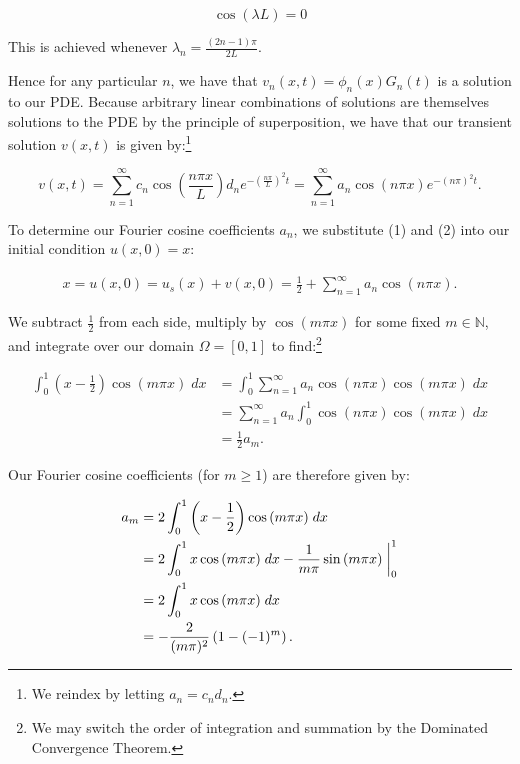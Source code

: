 \begin{solution}
    $$
    \cos{(\lambda L)} = 0
    $$

    This is achieved whenever $\lambda_n = \frac{(2 n - 1) \pi}{2L}$.

    Hence for any particular $n$, we have that $v_n(x, t) = \phi_n(x)G_n(t)$ is a solution to our PDE. Because arbitrary
    linear combinations of solutions are themselves solutions to the PDE by the principle of superposition, we have that
    our transient solution $v(x, t)$ is given by:\footnote{
        We reindex by letting $a_n = c_n d_n$.
    }

    \begin{equation}
    v(x, t) = \sum\limits_{n=1}^{\infty}{c_n \cos{\left(\frac{n \pi x}{L}\right)}} d_n e^{-\left(\frac{n \pi}{L}\right)^2 t}
            = \sum\limits_{n=1}^{\infty}{a_n \cos{(n \pi x)}} e^{-(n \pi)^2 t}.
    \end{equation}

    To determine our Fourier cosine coefficients $a_n$, we substitute (1) and (2) into our initial condition 
    $u(x, 0) = x$:

    \begin{align*}
        x = u(x, 0) = u_s(x) + v(x, 0) = \frac{1}{2} + \sum\limits_{n=1}^{\infty}{a_n \cos{(n \pi x)}}.
    \end{align*}

    We subtract $\frac{1}{2}$ from each side, multiply by $\cos{(m \pi x)}$ for some fixed $m \in \mathbb{N}$, and 
    integrate over our domain $\Omega = [0, 1]$ to find:\footnote{
        We may switch the order of integration and summation by the Dominated Convergence Theorem.
    }

    \begin{align*}
        \int_{0}^{1}{\left(x - \frac{1}{2}\right) \cos{(m \pi x)}\; dx}
            &= \int_{0}^{1}{\sum\limits_{n=1}^{\infty}{a_n \cos{(n \pi x)} \cos{(m \pi x)} }\; dx} \\
            &= \sum\limits_{n=1}^{\infty}{a_n \int_{0}^{1}{\cos{(n \pi x)} \cos{(m \pi x)}\; dx }} \\
            &= \frac{1}{2} a_m.
    \end{align*}

    Our Fourier cosine coefficients (for $m \ge 1$) are therefore given by:

    \begin{alignat*}{2}
        a_m &= 2 \int_{0}^{1}{\left( x - \frac{1}{2} \right) \cos{(m \pi x)}\; dx} \\
            &= 2 \int_{0}^{1}{x \cos{(m \pi x)}\; dx} - \frac{1}{m \pi} \sin{(m \pi x)} \biggm\rvert_{0}^{1} \\
            &= 2 \int_{0}^{1}{x \cos{(m \pi x)}\; dx} \\
            &= -\frac{2}{(m \pi)^2} \left(1 - (-1)^{m}\right).
    \end{alignat*}


\end{solution}
